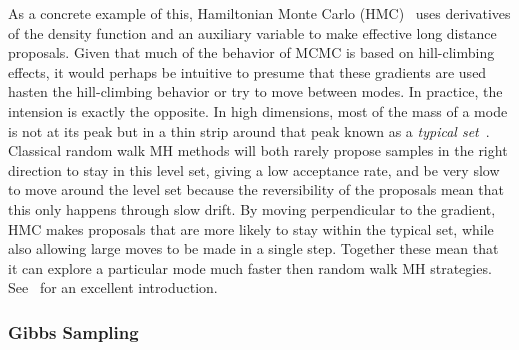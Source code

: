 As a concrete example of this, Hamiltonian Monte Carlo (HMC)~\citep{duane1987hybrid,neal2011mcmc} uses derivatives of
the density function and an auxiliary variable to make effective long distance proposals.  Given that
much of the behavior of MCMC is based on hill-climbing effects, it would perhaps be intuitive to presume that
these gradients are used hasten the hill-climbing behavior or try to move between modes.  In practice, the intension 
is exactly the opposite.  In high dimensions, most of the mass of a mode is not at its peak but in a thin strip
around that peak known as a \emph{typical set}~\citep{betancourt2017conceptual}.  Classical random walk MH
methods will both rarely propose samples in the right direction to stay in this level set, giving a low acceptance rate,
and be very slow to move around the level set because the reversibility of the proposals mean that this only 
happens through slow drift.  By moving perpendicular to the gradient, HMC makes proposals that are more likely to
stay within the typical set, while also allowing large moves to be made in a single step.  Together these mean
that it can explore a particular mode much faster then random walk MH strategies.  See~\citep{betancourt2017conceptual}
for an excellent introduction.

\subsubsection{Gibbs Sampling}
\label{sec:inf:foundation:gibbs}

